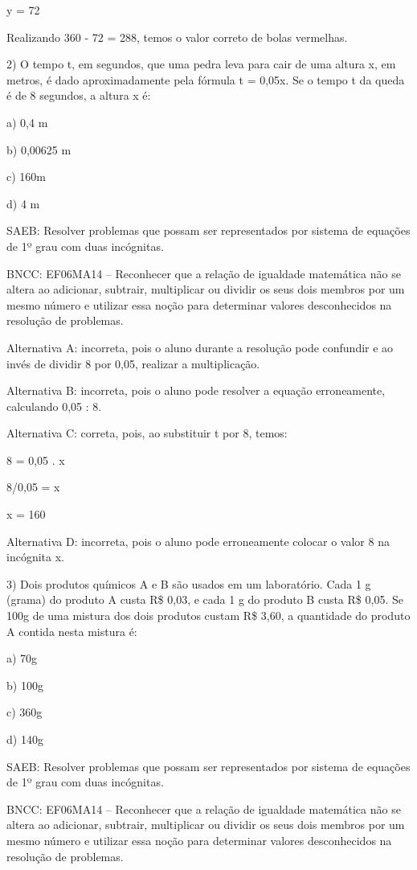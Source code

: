 y = 72

Realizando 360 - 72 = 288, temos o valor correto de bolas vermelhas.

2) O tempo t, em segundos, que uma pedra leva para cair de uma altura x,
em metros, é dado aproximadamente pela fórmula t = 0,05x. Se o tempo t
da queda é de 8 segundos, a altura x é:

a) 0,4 m

b) 0,00625 m

c) 160m

d) 4 m

SAEB: Resolver problemas que possam ser representados por sistema de
equações de 1º grau com duas incógnitas.

BNCC: EF06MA14 -- Reconhecer que a relação de igualdade matemática não
se altera ao adicionar, subtrair, multiplicar ou dividir os seus dois
membros por um mesmo número e utilizar essa noção para determinar
valores desconhecidos na resolução de problemas.

Alternativa A: incorreta, pois o aluno durante a resolução pode
confundir e ao invés de dividir 8 por 0,05, realizar a multiplicação.

Alternativa B: incorreta, pois o aluno pode resolver a equação
erroneamente, calculando 0,05 : 8.

Alternativa C: correta, pois, ao substituir t por 8, temos:

8 = 0,05 . x

8/0,05 = x

x = 160

Alternativa D: incorreta, pois o aluno pode erroneamente colocar o valor
8 na incógnita x.

3) Dois produtos químicos A e B são usados em um laboratório. Cada 1 g
(grama) do produto A custa R\$ 0,03, e cada 1 g do produto B custa R\$
0,05. Se 100g de uma mistura dos dois produtos custam R\$ 3,60, a
quantidade do produto A contida nesta mistura é:

a) 70g

b) 100g

c) 360g

d) 140g

SAEB: Resolver problemas que possam ser representados por sistema de
equações de 1º grau com duas incógnitas.

BNCC: EF06MA14 -- Reconhecer que a relação de igualdade matemática não
se altera ao adicionar, subtrair, multiplicar ou dividir os seus dois
membros por um mesmo número e utilizar essa noção para determinar
valores desconhecidos na resolução de problemas.

